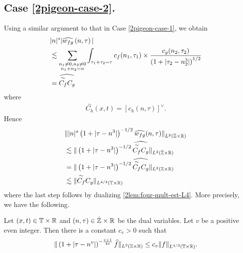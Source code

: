 \subsection{Case \ref{2pigeon-case-2}.}
Using a similar argument to that in Case \eqref{2pigeon-case-1}, we obtain
%
%
\begin{equation}
	\label{21f}
	\begin{split}
		& |n|^s  | \widehat{w_{fg}}\left( 
		n, \tau \right) |
		\\
		& \lesssim 
		\sum_{\substack{n_1 \neq0, n_2 \neq 0 \\n_1 + n_2 =n}} \int_{\tau_1 + \tau_2 = \tau}		c_f(n_1, \tau_1)
		\times
		\frac{c_g(n_2, \tau_2)}{\left( 1 + | \tau_2 - n_2^3 | 
		\right)^{1/2}} 
		\\
		& = \widehat{\overset{\sim}{C_f} C_g}
	\end{split}
\end{equation}
%
where
%
%
\begin{equation*}
	\begin{split}
		\overset{\sim}{C_h}(x,t) = \left[ c_h(n, \tau) \right]^\vee.
	\end{split}
\end{equation*}
%
%
Hence
%
\begin{equation}
	\label{23f}
	\begin{split}
		& \| |n|^s \left( 1 + | \tau - n^3 | \right)^{-1/2} \widehat{w_{fg}}(n, \tau) 
		\|_{L^2(\dot{\mathbb{Z}} \times \mathbb{R})}
		\\
		& \lesssim \|\left( 1 + | \tau - n^{3} | \right)^{-1/2} 
		\widehat{\overset{\sim}{C_f} C_g } \|_{L^2(\dot{\mathbb{Z}} \times \mathbb{R})}
		\\
		& =  \|\left( 1 + | \tau - n^{3} | \right)^{-1/2} 
		\widehat{\overset{\sim}{C_f} C_g } \|_{L^2(\mathbb{Z} \times \mathbb{R})}
		\\
		& \lesssim  \|\overset{\sim}{C_f} C_g  \|_{L^{4/3}(\mathbb{T} \times \mathbb{R})}
	\end{split}
\end{equation}
%
where the last step follows by dualizing \cref{2lem:four-mult-est-L4}. More
precisely, we have the following.
\begin{corollary}
	\label{2cor:four-mult-est-L4}
	Let $(x, t) \in \mathbb{T} \times \mathbb{R} $ and $(n, \tau) \in \dot{\mathbb{Z}} \times \mathbb{R}$ be 
	the dual variables. Let $v$ be a positive even integer. Then there is a 
	constant $c_v > 0$ such that
%
%
\begin{equation}
	\label{2four-mult-est-L4st}
	\begin{split}
		\| \left( 1 + | \tau - n^v | 
		\right)^{-\frac{v+1}{4v}}
		\widehat{f}\|_{L^2(\mathbb{Z} \times \mathbb{R})} \le c_v \|f \|_{L^{4/3}( \mathbb{T} \times \mathbb{R})}.
	\end{split}
\end{equation}
%
%
\end{corollary}
